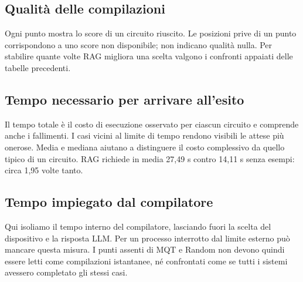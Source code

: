 \clearpage{}\begin{landscape}\pagestyle{empty}\TestLandscapePagetrue
\subsection{Qualità delle compilazioni}
Ogni punto mostra lo score di un circuito riuscito. Le posizioni prive di un punto corrispondono a uno score non disponibile; non indicano qualità nulla. Per stabilire quante volte RAG migliora una scelta valgono i confronti appaiati delle tabelle precedenti.

\begin{center}

\end{center}\end{landscape}\restoregeometry
\clearpage{}\begin{landscape}\pagestyle{empty}\TestLandscapePagetrue
\subsection{Tempo necessario per arrivare all’esito}
Il tempo totale è il costo di esecuzione osservato per ciascun circuito e comprende anche i fallimenti. I casi vicini al limite di tempo rendono visibili le attese più onerose. Media e mediana aiutano a distinguere il costo complessivo da quello tipico di un circuito. RAG richiede in media 27,49 s contro 14,11 s senza esempi: circa 1,95 volte tanto.

\begin{center}

\end{center}\end{landscape}\restoregeometry
\clearpage{}\begin{landscape}\pagestyle{empty}\TestLandscapePagetrue
\subsection{Tempo impiegato dal compilatore}
Qui isoliamo il tempo interno del compilatore, lasciando fuori la scelta del dispositivo e la risposta LLM. Per un processo interrotto dal limite esterno può mancare questa misura. I punti assenti di MQT e Random non devono quindi essere letti come compilazioni istantanee, né confrontati come se tutti i sistemi avessero completato gli stessi casi.

\begin{center}

\end{center}\end{landscape}\restoregeometry
